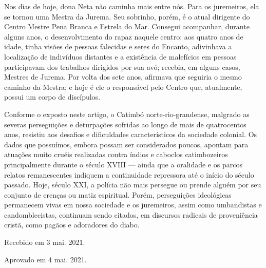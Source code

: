 \begin{refsection}
    Nos dias de hoje, dona Neta não caminha mais entre nós. Para os juremeiros, ela se tornou uma Mestra da Jurema. Seu sobrinho, porém, é o atual dirigente do Centro Mestre Pena Branca e Estrela do Mar. Consegui acompanhar, durante alguns anos, o desenvolvimento do rapaz naquele centro: aos quatro anos de idade, tinha visões de pessoas falecidas e seres do Encanto, adivinhava a localização de indivíduos distantes e a existência de malefícios em pessoas participavam dos trabalhos dirigidos por sua avó; recebia, em alguns casos, Mestres de Jurema. Por volta dos sete anos, afirmava que seguiria o mesmo caminho da Mestra; e hoje é ele o responsável pelo Centro que, atualmente, possui um corpo de discípulos. 

    Conforme o exposto neste artigo, o Catimbó norte-rio-grandense, malgrado as severas perseguições e deturpações sofridas ao longo de mais de quatrocentos anos, resistiu aos desafios e dificuldades característicos da sociedade colonial. Os dados que possuímos, embora possam ser considerados poucos, apontam para atuações muito cruéis realizadas contra índios e caboclos catimbozeiros principalmente durante o século XVIII --- ainda que a oralidade e os parcos relatos remanescentes indiquem a continuidade repressora até o início do século passado. Hoje, século XXI, a polícia não mais persegue ou prende alguém por seu conjunto de crenças ou matiz espiritual. Porém, perseguições ideológicas permanecem vivas em nossa sociedade e os juremeiros, assim como umbandistas e candomblecistas, continuam sendo citados, em discursos radicais de proveniência cristã, como pagãos e adoradores do diabo.

    \nocite{Assuncao2006Reino}

    \printbibliography[heading=subbibliography,notcategory=fullcited]

    \hfill Recebido em 3 mai. 2021.

    \hfill Aprovado em 4 mai. 2021.

    \label{chap:silencioend}

\end{refsection}
